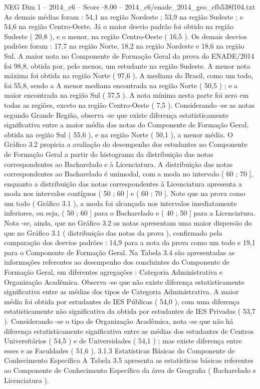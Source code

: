 \begin{textsample}{NEG Dim 1 – 2014\_c6 – Score -8.00 – 2014\_c6/enade\_2014\_geo\_cfb538f104.txt}
As demais médias foram : 54,1 na região Nordeste ; 53,9 na região Sudeste ; e 54,6 na região Centro-Oeste.
Já o maior desvio padrão foi obtido na região Sudeste ( 20,8 ), e o menor, na região Centro-Oeste ( 16,5 ).
Os demais desvios padrões foram : 17,7 na região Norte, 18,2 na região Nordeste e 18,6 na região Sul.
A maior nota no Componente de Formação Geral da prova do ENADE/2014 foi 98,8, obtida por, pelo menos, um estudante na região Sudeste.
A menor nota máxima foi obtida na região Norte ( 97,6 ).
A mediana do Brasil, como um todo, foi 55,8, sendo a A menor mediana encontrada na região Norte ( 50,5 ) ; e a maior encontrada na região Sul ( 57,5 ).
A nota mínima nesta parte foi zero em todas as regiões, exceto na região Centro-Oeste ( 7,5 ).
Considerando -se as notas segundo Grande Região, observa -se que existe diferença estatisticamente significativa entre a maior média das notas do Componente de Formação Geral, obtida na região Sul ( 55,6 ), e na região Norte ( 50,1 ), a menor média.
O Gráfico 3.2 propicia a avaliação do desempenho dos estudantes no Componente de Formação Geral a partir do histograma da distribuição das notas correspondentes ao Bacharelado e à Licenciatura.
A distribuição das notas correspondentes ao Bacharelado é unimodal, com a moda no intervalo ( 60 ; 70 ], enquanto a distribuição das notas correspondentes à Licenciatura apresenta a moda nos intervalos contíguos ( 50 ; 60 ] e ( 60 ; 70 ].
Note que na prova como um todo ( Gráfico 3.1 ), a moda foi alcançada nos intervalos imediatamente inferiores, ou seja, ( 50 ; 60 ] para o Bacharelado e ( 40 ; 50 ] para a Licenciatura.
Nota -se, ainda, que no Gráfico 3.2 as notas apresentam uma maior dispersão do que no Gráfico 3.1 ( distribuição das notas da prova ), confirmado pela comparação dos desvios padrões : 14,9 para a nota da prova como um todo e 19,1 para o Componente de Formação Geral.
Na Tabela 3.4 são apresentadas as informações referentes ao desempenho dos concluintes do Componente de Formação Geral, em diferentes agregações : Categoria Administrativa e Organização Acadêmica.
Observa -se que não existe diferença estatisticamente significativa entre as médias dos tipos de Categoria Administrativa.
A maior média foi obtida por estudantes de IES Públicas ( 54,0 ), com uma diferença estatisticamente não significativa da obtida por estudantes de IES Privadas ( 53,7 ).
Considerando -se o tipo de Organização Acadêmica, nota -se que não há diferença estatisticamente significativa entre as médias dos estudantes de Centros Universitários ( 54,5 ) e de Universidades ( 54,1 ) ; mas existe diferença entre esses e as Faculdades ( 51,6 ). 3.1.3 Estatísticas Básicas do Componente de Conhecimento Específico A Tabela 3.5 apresenta as estatísticas básicas referentes ao Componente de Conhecimento Específico da área de Geografia ( Bacharelado e Licenciatura ).

\end{textsample}
